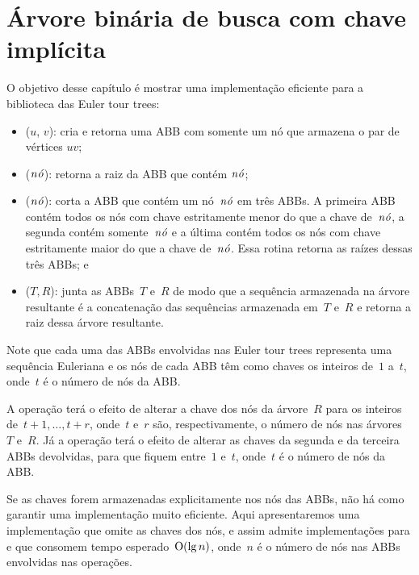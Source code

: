 \chapter{Árvore binária de busca com chave implícita}
\label{sec:TreapDeChaveImplicita}

O objetivo desse capítulo é mostrar uma implementação eficiente para a biblioteca das Euler tour trees:
\begin{itemize}
\item  \treapCreate($u$, $v$): cria e retorna uma ABB com somente um nó que armazena o par de vértices $uv$;
\item \treapGetRoot($\mathit{n\acute{o}}$): retorna a raiz da ABB que contém $\mathit{n\acute{o}}$;
\item \treapSplit($\mathit{n\acute{o}}$): corta a ABB que contém um nó~$\mathit{n\acute{o}}$ em três ABBs. A primeira ABB contém todos os nós com chave estritamente menor do que a chave de~$\mathit{n\acute{o}}$, a segunda contém somente~$\mathit{n\acute{o}}$ e a última contém todos os nós com chave estritamente maior do que a chave de~$\mathit{n\acute{o}}$. Essa rotina retorna as raízes dessas três ABBs; e
\item \treapJoin($T, R$): junta as ABBs~$T$ e~$R$ de modo que a sequência armazenada na árvore resultante é a concatenação das sequências armazenada em~$T$ e~$R$ e retorna a raiz dessa árvore resultante.
\end{itemize}

Note que cada uma das ABBs envolvidas nas Euler tour trees representa uma sequência Euleriana e os nós de cada ABB têm como chaves os inteiros de~$1$ a~$t$, onde~$t$ é o número de nós da ABB.

A operação \treapJoin{} terá o efeito de alterar a chave dos nós da árvore~$R$ para os inteiros de~$t+1,\ldots,t+r$, onde~$t$ e~$r$ são, respectivamente, o número de nós nas árvores~$T$ e~$R$.
Já a operação \treapSplit{} terá o efeito de alterar as chaves da segunda e da terceira ABBs devolvidas, para que fiquem entre~$1$ e~$t$, onde~$t$ é o número de nós da ABB.

Se as chaves forem armazenadas explicitamente nos nós das ABBs, não há como garantir uma implementação muito eficiente.
Aqui apresentaremos uma implementação que omite as chaves dos nós, e assim admite implementações para \treapJoin{} e \treapSplit{} que consomem tempo esperado~$\mathrm{O}(\lg n)$, onde~$n$ é o número de nós nas ABBs envolvidas nas operações.

